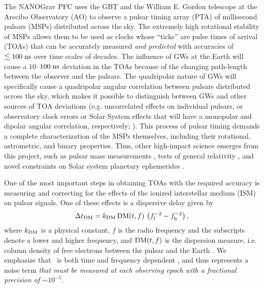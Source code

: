 \documentclass[10pt]{myNSF}
\begin{document}
The NANOGrav PFC uses the GBT and the William E. Gordon telescope at
the Arecibo Observatory (AO) to observe a pulsar timing array (PTA) of
millisecond pulsars (MSPs) distributed across the sky.  The extremely
high rotational stability of MSPs allows them to be used as clocks
whose ``ticks'' are pulse times of arrival (TOAs) that can be
accurately measured \emph{and predicted} with accuracies of $\lesssim
100\; \textrm{ns}$ over time scales of decades.  The influence of GWs at the
Earth will cause a $10$--$100\; \textrm{ns}$ deviation in the TOAs because of
the changing path-length between the observer and the pulsars.  The
quadripolar nature of GWs will specifically cause a quadripolar
angular correlation between pulsars distributed across the sky, which
makes it possible to distinguish between GWs and other sources of TOA
deviations (e.g. uncorrelated effects on individual pulsars, or
observatory clock errors or Solar System effects that will have a
monopolar and dipolar angular correlation, respectively; \cite{hd83}).
This process of pulsar timing demands a complete characterization of
the MSPs themselves, including their rotational, astrometric, and
binary properties.  Thus, other high-impact science emerges from this
project, such as pulsar mass measurements \citep{epe+16}, tests of
general relativity \citep{zsd+15}, and novel constraints on Solar
system planetary ephemerides \citep{abb+18}.

One of the most important steps in obtaining TOAs with the required
accuracy is measuring and correcting for the effects of the ionized
interstellar medium (ISM) on pulsar signals.  One of these effects is
a dispersive delay given by
\begin{equation}
  \Delta t_{\rm DM} = k_{\rm DM} \, \textrm{DM}(t,f)\, \left( f_{\rm l}^{-2} -
  f_{\rm h}^{-2} \right) ,
\end{equation}
where $k_{\rm DM}$ is a physical constant, $f$ is the radio frequency
and the subscripts denote a lower and higher frequency, and $\textrm{DM}(t,f)$
is the dispersion measure, i.e. column density of free electrons
between the pulsar and the Earth \citep[e.g.][]{lk12}.  We emphasize
that \DM\ is both time and frequency dependent \citep{css16}, and thus
represents a noise term \emph{that must be measured at each observing
  epoch with a fractional precision of $\sim 10^{-5}$}.
\end{document}
